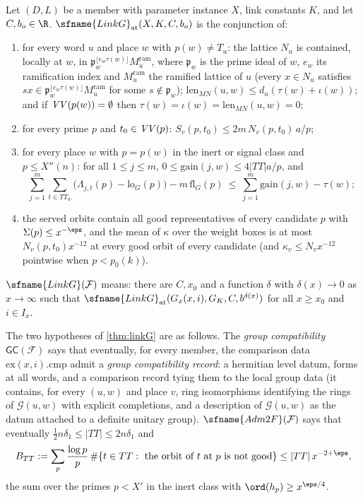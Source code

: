 \begin{definition}\label{pf:linkG:linkGat}
Let $(D,L)$ be a member with parameter instance $X$, link constants $K$, and let $C,b_o\in\R$.
$\sfname{LinkG}_{\mathrm{at}}(X,K,C,b_o)$ is the conjunction of:
\begin{enumerate}[label=(\roman*)]
\item for every word $u$ and place $w$ with $p(w)\ne T_u$: the lattice $N_u$ is contained, locally at $w$, in
$\mathfrak p_w^{\lfloor e_w\tau(w)\rfloor}M_u^{\mathrm{ram}}$, where $\mathfrak p_w$ is the prime ideal of $w$, $e_w$ its
ramification index and $M_u^{\mathrm{ram}}$ the ramified lattice of $u$ (every $x\in N_u$ satisfies
$sx\in\mathfrak p_w^{\lfloor e_w\tau(w)\rfloor}M_u^{\mathrm{ram}}$ for some $s\notin\mathfrak p_w$);
$\mathrm{len}_{MN}(u,w)\le d_u(\tau(w)+\iota(w))$; and if $\mathit{VV}(p(w))=\emptyset$ then
$\tau(w)=\iota(w)=\mathrm{len}_{MN}(u,w)=0$;
\item for every prime $p$ and $t_0\in\mathit{VV}(p)$: $S_v(p,t_0)\le2m\,N_v(p,t_0)\,a/p$;
\item for every place $w$ with $p=p(w)$ in the inert or signal class and $p\le X''(n)$: for all $1\le j\le m$,
$0\le\mathrm{gain}(j,w)\le4|TT|a/p$, and
\begin{equation}\label{eq:pf:linkG:vonMangoldt}
\sum_{j=1}^m\sum_{t\in TT_w}\bigl(\Lambda_{j,t}(p)-\mathrm{lo}_G(p)\bigr)-m\,\mathrm{fl}_G(p)\ \le\
\sum_{j=1}^m\mathrm{gain}(j,w)-\tau(w);
\end{equation}
\item the served orbits contain all good representatives of every candidate $p$ with $\Sigma(p)\le x^{-\eps}$, and
the mean of $\kappa$ over the weight boxes is at most $N_v(p,t_0)x^{-12}$ at every good orbit of every candidate
(and $\kappa_v\le N_vx^{-12}$ pointwise when $p<p_0(k)$).
\end{enumerate}
$\sfname{LinkG}(\mathcal F)$ means: there are $C,x_0$ and a function $\delta$ with $\delta(x)\to0$ as $x\to\infty$
such that $\sfname{LinkG}_{\mathrm{at}}(G_x(x,i),G_K,C,b^{\delta(x)})$ for all $x\ge x_0$ and $i\in I_x$.
\formal{Formalism.MainNotions.LinkG_at}
\end{definition}

The two hypotheses of \cref{thm:linkG} are as follows. The \emph{group compatibility} $\mathsf{GC}(\mathcal F)$ says that
eventually, for every member, the comparison data $\mathrm{ex}(x,i).\mathrm{cmp}$ admit a \emph{group compatibility
record}: a hermitian level datum, forms at all words, and a comparison record tying them to the local group data
(it contains, for every $(u,w)$ and place $v$, ring isomorphisms identifying the rings of $\mathcal G(u,w)$ with
explicit completions, and a description of $\mathcal G(u,w)$ as the datum attached to a definite unitary group).
$\sfname{Adm2F}(\mathcal F)$ says that eventually $\tfrac12n\delta_1\le|TT|\le2n\delta_1$ and
\begin{equation}\label{eq:pf:linkG:adm2}
B_{TT}:=\sum_{p}\frac{\log p}{p}\,\#\{t\in TT:\ \text{the orbit of }t\text{ at }p\text{ is not good}\}\le|TT|\,x^{-2+\eps},
\end{equation}
the sum over the primes $p<X'$ in the inert class with $\ord(h_p)\ge x^{\eps/4}$.

